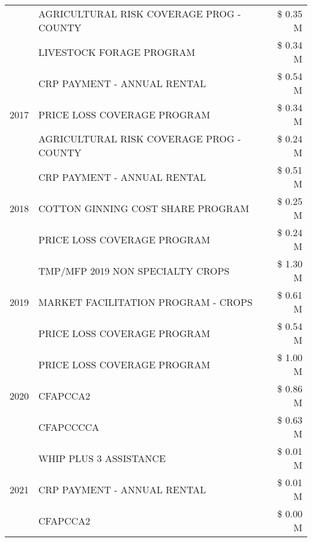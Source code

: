 \begin{tabular}{llr}
 & AGRICULTURAL RISK COVERAGE PROG - COUNTY & \$ 0.35 M \\
 & LIVESTOCK FORAGE PROGRAM & \$ 0.34 M \\
\cline{1-3}
\multirow[t]{3}{*}{2017} & CRP PAYMENT - ANNUAL RENTAL & \$ 0.54 M \\
 & PRICE LOSS COVERAGE PROGRAM & \$ 0.34 M \\
 & AGRICULTURAL RISK COVERAGE PROG - COUNTY & \$ 0.24 M \\
\cline{1-3}
\multirow[t]{3}{*}{2018} & CRP PAYMENT - ANNUAL RENTAL & \$ 0.51 M \\
 & COTTON GINNING COST SHARE PROGRAM & \$ 0.25 M \\
 & PRICE LOSS COVERAGE PROGRAM & \$ 0.24 M \\
\cline{1-3}
\multirow[t]{3}{*}{2019} & TMP/MFP 2019 NON SPECIALTY CROPS & \$ 1.30 M \\
 & MARKET FACILITATION PROGRAM - CROPS & \$ 0.61 M \\
 & PRICE LOSS COVERAGE PROGRAM & \$ 0.54 M \\
\cline{1-3}
\multirow[t]{3}{*}{2020} & PRICE LOSS COVERAGE PROGRAM & \$ 1.00 M \\
 & CFAPCCA2 & \$ 0.86 M \\
 & CFAPCCCCA & \$ 0.63 M \\
\cline{1-3}
\multirow[t]{3}{*}{2021} & WHIP PLUS 3 ASSISTANCE & \$ 0.01 M \\
 & CRP PAYMENT - ANNUAL RENTAL & \$ 0.01 M \\
 & CFAPCCA2 & \$ 0.00 M \\
\cline{1-3}
\bottomrule
\end{tabular}
